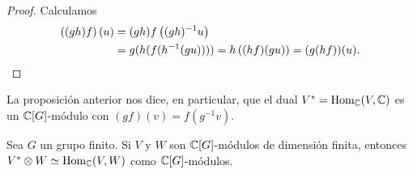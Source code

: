 \begin{proof}
	Calculamos
	\begin{align*}
		\left( (gh)f \right)(u)&=(gh)f\left( (gh)^{-1}u \right)\\
		&=g(h(f(h^{-1}(gu))))=h\left( (hf)(gu) \right)=(g(hf))(u).\qedhere
	\end{align*}
\end{proof}

La proposición anterior nos dice, en particular, que el dual
$V^*=\operatorname{Hom}_{\mathbb{C}}(V,\mathbb{C})$ es un $\mathbb{C}[G]$-módulo con $(gf)(v)=f(g^{-1}v)$. 

\begin{exercise}
	Sea $G$ un grupo finito. Si $V$ y $W$ son $\mathbb{C}[G]$-módulos de dimensión finita, entonces
	$V^*\otimes W\simeq\operatorname{Hom}_{\mathbb{C}}(V,W)$ 
	como $\mathbb{C}[G]$-módulos.
\end{exercise}